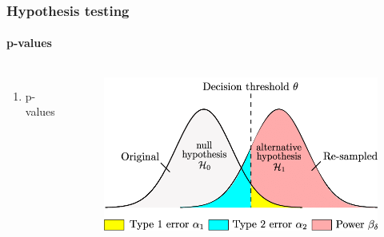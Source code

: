 \documentclass[aspectratio=43]{beamer}
\begin{document}
\begin{frame}
	
	\frametitle{Hypothesis testing}
	\framesubtitle{p-values}
	
	\footnotesize
	
	\begin{columns}
		
		
		\begin{enumerate}
			\item p-values
		\end{enumerate}
		
		
		\begin{figure}[!htb]
			\includegraphics[width = \linewidth]{plots/part3/hypothesis.png}
		\end{figure}
		
	\end{columns}

\end{frame}
\end{document}

